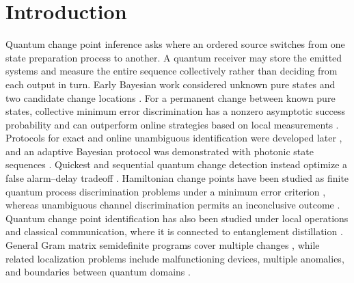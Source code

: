 \section{Introduction}\label{introduction}

Quantum change point inference asks where an ordered source switches from one
state preparation process to another. A quantum receiver may store the emitted
systems and measure the entire sequence collectively rather than deciding from
each output in turn. Early Bayesian work considered unknown pure states and
two candidate change locations \cite{akimoto2011}. For a permanent change
between known pure states, collective minimum error discrimination has a
nonzero asymptotic success probability and can outperform online strategies
based on local measurements \cite{sentis2016}. Protocols for exact and online
unambiguous identification were developed later
\cite{sentis2017,sentis2018}, and an adaptive
Bayesian protocol was demonstrated with photonic state sequences
\cite{yu2018}. Quickest and sequential quantum change detection instead optimize a false alarm--delay tradeoff
\cite{fanizza2023,guha2025,zecchin2026}. Hamiltonian change points have been
studied as finite quantum process discrimination problems under a
minimum error criterion \cite{nakahira2023}, whereas unambiguous channel
discrimination permits an inconclusive outcome \cite{nakahira2026}. Quantum change point identification has also been studied under local
operations and classical communication, where it is connected to
entanglement distillation \cite{banerjee2024}. General Gram matrix
semidefinite programs cover multiple changes \cite{mohan2023}, while related
localization problems include malfunctioning devices, multiple anomalies, and
boundaries between quantum domains
\cite{skotiniotis2024,llorens2024,llorens2025}.



